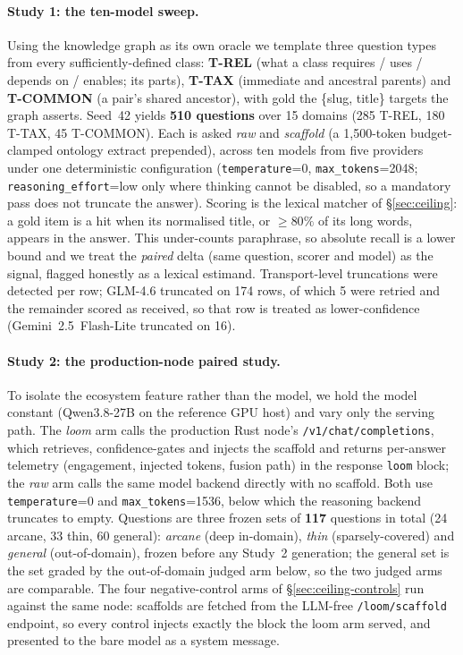 \documentclass[10pt,twocolumn]{article}
\begin{document}
\paragraph{Study 1: the ten-model sweep.} Using the knowledge graph as its own
oracle we template three question types from every sufficiently-defined class: \textbf{T-REL} (what
a class requires / uses / depends on / enables; its parts), \textbf{T-TAX} (immediate and ancestral
parents) and \textbf{T-COMMON} (a pair's shared ancestor), with gold the \{slug, title\} targets
the graph asserts. Seed~42 yields \textbf{510 questions} over 15 domains (285 T-REL, 180 T-TAX, 45
T-COMMON). Each is asked \emph{raw} and \emph{scaffold} (a 1{,}500-token budget-clamped ontology
extract prepended), across ten models from five providers under one deterministic configuration
(\texttt{temperature}=0, \texttt{max\_tokens}=2048; \texttt{reasoning\_effort}=low only where
thinking cannot be disabled, so a mandatory pass does not truncate the answer). Scoring is the
lexical matcher of \S\ref{sec:ceiling}: a gold item is a hit when its normalised title, or
$\geq80\%$ of its long words, appears in the answer. This under-counts paraphrase, so absolute
recall is a lower bound and we treat the \emph{paired} delta (same question, scorer and model) as
the signal, flagged honestly as a lexical estimand. Transport-level truncations were detected per row;
GLM-4.6 truncated on 174 rows, of which 5 were retried and the remainder scored as received, so that
row is treated as lower-confidence (Gemini~2.5~Flash-Lite truncated on 16).

\paragraph{Study 2: the production-node paired study.} To isolate the ecosystem feature
rather than the model, we hold the model constant (Qwen3.8-27B on the reference GPU host) and vary
only the serving path. The \emph{loom} arm calls the production Rust node's
\texttt{/v1/chat/completions}, which retrieves, confidence-gates and injects the scaffold and returns
per-answer telemetry (engagement, injected tokens, fusion path) in the response \texttt{loom} block;
the \emph{raw} arm calls the same model backend directly with no scaffold. Both use
\texttt{temperature}=0 and \texttt{max\_tokens}=1536, below which the reasoning backend truncates to
empty. Questions are three frozen sets of \textbf{117} questions in total (24 arcane, 33 thin,
60 general): \emph{arcane} (deep in-domain), \emph{thin} (sparsely-covered) and \emph{general}
(out-of-domain), frozen before any Study~2 generation; the general set is the
set graded by the out-of-domain judged arm below, so the two judged arms are comparable. The four
negative-control arms of \S\ref{sec:ceiling-controls} run against the
same node: scaffolds are fetched from the LLM-free \texttt{/loom/scaffold} endpoint, so every
control injects exactly the block the loom arm served, and presented to the bare model as a system
message.
\end{document}
